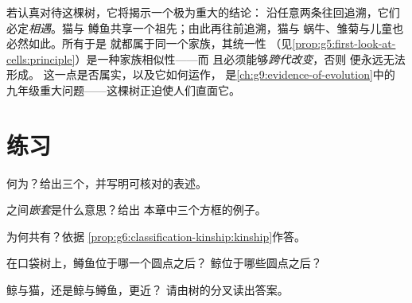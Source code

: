 \begin{remark}[树形图悄然蕴含的意义]\label{rem:g6:classification-kinship:implies}
若认真对待这棵树，它将揭示一个极为重大的结论：
沿任意两条往回追溯，它们必定\emph{相遇}。猫与
鳟鱼共享一个祖先；由此再往前追溯，猫与
蜗牛、雏菊与儿童也必然如此。所有于是
就都属于同一个家族，其统一性
（见\cref{prop:g5:first-look-at-cells:principle}）是一种家族相似性——而
且必须能够\emph{跨代改变}，否则
便永远无法形成。
这一点是否属实，以及它如何运作，
是\cref{ch:g9:evidence-of-evolution}中的
九年级重大问题——这棵树正迫使人们直面它。
\end{remark}

\section{练习}

\begin{exercise}[$\star$]\label{exo:g6:classification-kinship:1}
何为？给出三个，并写明可核对的表述。
\end{exercise}

\begin{exercise}[$\star$]\label{exo:g6:classification-kinship:2}
之间\emph{嵌套}是什么意思？给出
本章中三个方框的例子。
\end{exercise}

\begin{exercise}[$\star$]\label{exo:g6:classification-kinship:3}
为何共有？依据
\cref{prop:g6:classification-kinship:kinship}作答。
\end{exercise}

\begin{exercise}[$\star$]\label{exo:g6:classification-kinship:4}
在口袋树上，鳟鱼位于哪一个圆点之后？
鲸位于哪些圆点之后？
\end{exercise}

\begin{exercise}[$\star$]\label{exo:g6:classification-kinship:5}
鲸与猫，还是鲸与鳟鱼，更近？
请由树的分叉读出答案。
\end{exercise}

